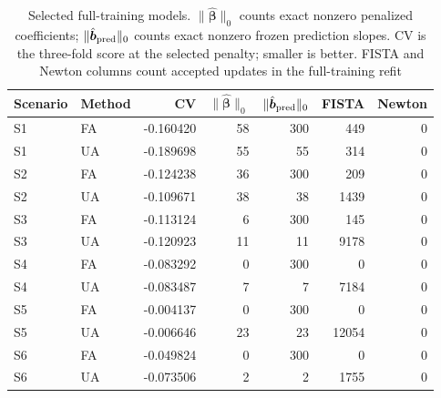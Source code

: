 \begin{table}[htbp]
\centering\small
\caption{Selected full-training models. $\|\hat{\bm{\beta}}\|_0$ counts exact nonzero penalized coefficients; $\|\hat{\bm{b}}_{\rm pred}\|_0$ counts exact nonzero frozen prediction slopes. CV is the three-fold score at the selected penalty; smaller is better. FISTA and Newton columns count accepted updates in the full-training refit}
\label{tab:cv-model-summary}
\setlength{\tabcolsep}{5pt}
\begin{tabular}{@{}llrrrrr@{}}
\toprule
Scenario & Method & CV & $\|\hat{\bm{\beta}}\|_0$ & $\|\hat{\bm{b}}_{\rm pred}\|_0$ & FISTA & Newton \\
\midrule
S1 & FA & -0.160420 & 58 & 300 & 449 & 0 \\
S1 & UA & -0.189698 & 55 & 55 & 314 & 0 \\
S2 & FA & -0.124238 & 36 & 300 & 209 & 0 \\
S2 & UA & -0.109671 & 38 & 38 & 1439 & 0 \\
S3 & FA & -0.113124 & 6 & 300 & 145 & 0 \\
S3 & UA & -0.120923 & 11 & 11 & 9178 & 0 \\
S4 & FA & -0.083292 & 0 & 300 & 0 & 0 \\
S4 & UA & -0.083487 & 7 & 7 & 7184 & 0 \\
S5 & FA & -0.004137 & 0 & 300 & 0 & 0 \\
S5 & UA & -0.006646 & 23 & 23 & 12054 & 0 \\
S6 & FA & -0.049824 & 0 & 300 & 0 & 0 \\
S6 & UA & -0.073506 & 2 & 2 & 1755 & 0 \\
\bottomrule
\end{tabular}
\end{table}
